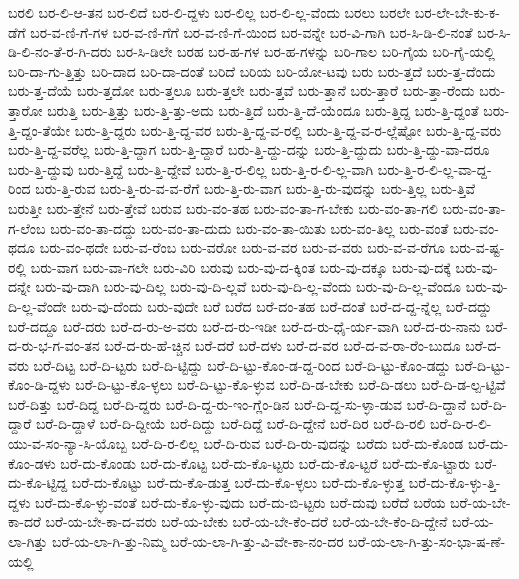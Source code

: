 {ಬರಲಿ
ಬರ-ಲಿ-ಆ-ತನ
ಬರ-ಲಿದೆ
ಬರ-ಲಿ-ದ್ದಳು
ಬರ-ಲಿಲ್ಲ
ಬರ-ಲಿ-ಲ್ಲ-ವೆಂದು
ಬರಲು
ಬರಲೇ
ಬರ-ಲೇ-ಬೇ-ಕು-ಕ-ಡೆಗೆ
ಬರ-ವ-ಣಿ-ಗೆ-ಗಳ
ಬರ-ವ-ಣಿ-ಗೆಗೆ
ಬರ-ವ-ಣಿ-ಗೆ-ಯಿಂದ
ಬರ-ವನ್ನೇ
ಬರ-ವಿ-ಗಾಗಿ
ಬರ-ಸಿ-ಡಿ-ಲಿ-ನಂತೆ
ಬರ-ಸಿ-ಡಿ-ಲಿ-ನಂ-ತೆ-ರ-ಗಿ-ದರು
ಬರ-ಸಿ-ಡಿಲೇ
ಬರಹ
ಬರ-ಹ-ಗಳ
ಬರ-ಹ-ಗಳನ್ನು
ಬರಿ-ಗಾಲ
ಬರಿ-ಗೈಯ
ಬರಿ-ಗೈ-ಯಲ್ಲಿ
ಬರಿ-ದಾ-ಗು-ತ್ತಿತ್ತು
ಬರಿ-ದಾದ
ಬರಿ-ದಾ-ದಂತೆ
ಬರಿದೆ
ಬರಿಯ
ಬರಿ-ಯೋ-ಟವು
ಬರು
ಬರು-ತ್ತದೆ
ಬರು-ತ್ತ-ದೆಂದು
ಬರು-ತ್ತ-ದೆಯೆ
ಬರು-ತ್ತದೋ
ಬರು-ತ್ತಲೂ
ಬರು-ತ್ತಲೇ
ಬರು-ತ್ತವೆ
ಬರು-ತ್ತಾನೆ
ಬರು-ತ್ತಾರೆ
ಬರು-ತ್ತಾ-ರೆಂದು
ಬರು-ತ್ತಾರೋ
ಬರುತ್ತಿ
ಬರು-ತ್ತಿತ್ತು
ಬರು-ತ್ತಿ-ತ್ತು-ಅದು
ಬರು-ತ್ತಿದೆ
ಬರು-ತ್ತಿ-ದೆ-ಯೆಂದೂ
ಬರು-ತ್ತಿದ್ದ
ಬರು-ತ್ತಿ-ದ್ದಂತೆ
ಬರು-ತ್ತಿ-ದ್ದಂ-ತೆಯೇ
ಬರು-ತ್ತಿ-ದ್ದರು
ಬರು-ತ್ತಿ-ದ್ದ-ವರ
ಬರು-ತ್ತಿ-ದ್ದ-ವ-ರಲ್ಲಿ
ಬರು-ತ್ತಿ-ದ್ದ-ವ-ರ-ಲ್ಲೆಷ್ಟೋ
ಬರು-ತ್ತಿ-ದ್ದ-ವರು
ಬರು-ತ್ತಿ-ದ್ದ-ವರೆಲ್ಲ
ಬರು-ತ್ತಿ-ದ್ದಾಗ
ಬರು-ತ್ತಿ-ದ್ದಾರೆ
ಬರು-ತ್ತಿ-ದ್ದು-ದನ್ನು
ಬರು-ತ್ತಿ-ದ್ದುದು
ಬರು-ತ್ತಿ-ದ್ದು-ವಾ-ದರೂ
ಬರು-ತ್ತಿ-ದ್ದುವು
ಬರು-ತ್ತಿದ್ದೆ
ಬರು-ತ್ತಿ-ದ್ದೇವೆ
ಬರು-ತ್ತಿ-ರ-ಲಿಲ್ಲ
ಬರು-ತ್ತಿ-ರ-ಲಿ-ಲ್ಲ-ವಾಗಿ
ಬರು-ತ್ತಿ-ರ-ಲಿ-ಲ್ಲ-ವಾ-ದ್ದ-ರಿಂದ
ಬರು-ತ್ತಿ-ರುವ
ಬರು-ತ್ತಿ-ರು-ವ-ವ-ರೆಗೆ
ಬರು-ತ್ತಿ-ರು-ವಾಗ
ಬರು-ತ್ತಿ-ರು-ವುದನ್ನು
ಬರು-ತ್ತಿಲ್ಲ
ಬರು-ತ್ತಿವೆ
ಬರುತ್ತೀ
ಬರು-ತ್ತೇನೆ
ಬರು-ತ್ತೇವೆ
ಬರುವ
ಬರು-ವಂ-ತಹ
ಬರು-ವಂ-ತಾ-ಗ-ಬೇಕು
ಬರು-ವಂ-ತಾ-ಗಲಿ
ಬರು-ವಂ-ತಾ-ಗ-ಲೆಂಬ
ಬರು-ವಂ-ತಾ-ದದ್ದು
ಬರು-ವಂ-ತಾ-ದುದು
ಬರು-ವಂ-ತಾ-ಯಿತು
ಬರು-ವಂ-ತಿಲ್ಲ
ಬರು-ವಂತೆ
ಬರು-ವಂ-ಥದೂ
ಬರು-ವಂ-ಥದೇ
ಬರು-ವ-ರೆಂಬ
ಬರು-ವರೋ
ಬರು-ವ-ವರ
ಬರು-ವ-ವರು
ಬರು-ವ-ವ-ರೆಗೂ
ಬರು-ವ-ಷ್ಟ-ರಲ್ಲಿ
ಬರು-ವಾಗ
ಬರು-ವಾ-ಗಲೇ
ಬರು-ವಿರಿ
ಬರುವು
ಬರು-ವು-ದ-ಕ್ಕಿಂತ
ಬರು-ವು-ದಕ್ಕೂ
ಬರು-ವು-ದಕ್ಕೆ
ಬರು-ವು-ದನ್ನೇ
ಬರು-ವು-ದಾಗಿ
ಬರು-ವು-ದಿಲ್ಲ
ಬರು-ವು-ದಿ-ಲ್ಲವೆ
ಬರು-ವು-ದಿ-ಲ್ಲ-ವೆಂದು
ಬರು-ವು-ದಿ-ಲ್ಲ-ವೆಂದೂ
ಬರು-ವು-ದಿ-ಲ್ಲ-ವೆಂದೇ
ಬರು-ವು-ದೆಂದು
ಬರು-ವುದೇ
ಬರೆ
ಬರೆದ
ಬರೆ-ದಂ-ತಹ
ಬರೆ-ದಂತೆ
ಬರೆ-ದ-ದ್ದ-ನ್ನೆಲ್ಲ
ಬರೆ-ದದ್ದು
ಬರೆ-ದದ್ದೂ
ಬರೆ-ದರು
ಬರೆ-ದ-ರು-ಅ-ವರು
ಬರೆ-ದ-ರು-ಇಡೀ
ಬರೆ-ದ-ರು-ಧೈ-ರ್ಯ-ವಾಗಿ
ಬರೆ-ದ-ರು-ನಾನು
ಬರೆ-ದ-ರು-ಭ-ಗ-ವಂ-ತನ
ಬರೆ-ದ-ರು-ಹೆ-ಚ್ಚಿನ
ಬರೆ-ದರೆ
ಬರೆ-ದಳು
ಬರೆ-ದ-ವರ
ಬರೆ-ದ-ವ-ರಾ-ರೆಂ-ಬುದೂ
ಬರೆ-ದ-ವರು
ಬರೆ-ದಿಟ್ಟ
ಬರೆ-ದಿ-ಟ್ಟರು
ಬರೆ-ದಿ-ಟ್ಟಿದ್ದು
ಬರೆ-ದಿ-ಟ್ಟು-ಕೊಂ-ಡ-ದ್ದ-ರಿಂದ
ಬರೆ-ದಿ-ಟ್ಟು-ಕೊಂ-ಡದ್ದು
ಬರೆ-ದಿ-ಟ್ಟು-ಕೊಂ-ಡಿ-ದ್ದಳು
ಬರೆ-ದಿ-ಟ್ಟು-ಕೊ-ಳ್ಳಲು
ಬರೆ-ದಿ-ಟ್ಟು-ಕೊ-ಳ್ಳುವ
ಬರೆ-ದಿ-ಡ-ಬೇಕು
ಬರೆ-ದಿ-ಡಲು
ಬರೆ-ದಿ-ಡ-ಲ್ಪ-ಟ್ಟಿವೆ
ಬರೆ-ದಿತ್ತು
ಬರೆ-ದಿದ್ದ
ಬರೆ-ದಿ-ದ್ದರು
ಬರೆ-ದಿ-ದ್ದ-ರು-ಇಂ-ಗ್ಲೆಂ-ಡಿನ
ಬರೆ-ದಿ-ದ್ದ-ಸು-ಳ್ಳಾ-ಡುವ
ಬರೆ-ದಿ-ದ್ದಾನೆ
ಬರೆ-ದಿ-ದ್ದಾರೆ
ಬರೆ-ದಿ-ದ್ದಾಳೆ
ಬರೆ-ದಿ-ದ್ದೀಯೆ
ಬರೆ-ದಿದ್ದು
ಬರೆ-ದಿದ್ದೆ
ಬರೆ-ದಿ-ದ್ದೇನೆ
ಬರೆ-ದಿರ
ಬರೆ-ದಿ-ರಲಿ
ಬರೆ-ದಿ-ರ-ಲಿ-ಯು-ವ-ಸಂ-ನ್ಯಾ-ಸಿ-ಯೊಬ್ಬ
ಬರೆ-ದಿ-ರ-ಲಿಲ್ಲ
ಬರೆ-ದಿ-ರುವ
ಬರೆ-ದಿ-ರು-ವುದನ್ನು
ಬರೆದು
ಬರೆ-ದು-ಕೊಂಡ
ಬರೆ-ದು-ಕೊಂ-ಡಳು
ಬರೆ-ದು-ಕೊಂಡು
ಬರೆ-ದು-ಕೊಟ್ಟ
ಬರೆ-ದು-ಕೊ-ಟ್ಟರು
ಬರೆ-ದು-ಕೊ-ಟ್ಟರೆ
ಬರೆ-ದು-ಕೊ-ಟ್ಟಾರು
ಬರೆ-ದು-ಕೊ-ಟ್ಟಿದ್ದ
ಬರೆ-ದು-ಕೊಟ್ಟು
ಬರೆ-ದು-ಕೊ-ಡುತ್ತ
ಬರೆ-ದು-ಕೊ-ಳ್ಳಲು
ಬರೆ-ದು-ಕೊ-ಳ್ಳುತ್ತ
ಬರೆ-ದು-ಕೊ-ಳ್ಳು-ತ್ತಿ-ದ್ದಳು
ಬರೆ-ದು-ಕೊ-ಳ್ಳು-ವಂತೆ
ಬರೆ-ದು-ಕೊ-ಳ್ಳು-ವುದು
ಬರೆ-ದು-ಬಿ-ಟ್ಟರು
ಬರೆ-ದುವು
ಬರೆದೆ
ಬರೆಯ
ಬರೆ-ಯ-ಬೇ-ಕಾ-ದರೆ
ಬರೆ-ಯ-ಬೇ-ಕಾ-ದ-ವರು
ಬರೆ-ಯ-ಬೇಕು
ಬರೆ-ಯ-ಬೇ-ಕೆಂ-ದರೆ
ಬರೆ-ಯ-ಬೇ-ಕೆಂ-ದಿ-ದ್ದೇನೆ
ಬರೆ-ಯ-ಲಾ-ಗಿತ್ತು
ಬರೆ-ಯ-ಲಾ-ಗಿ-ತ್ತು-ನಿಮ್ಮ
ಬರೆ-ಯ-ಲಾ-ಗಿ-ತ್ತು-ವಿ-ವೇ-ಕಾ-ನಂ-ದರ
ಬರೆ-ಯ-ಲಾ-ಗಿ-ತ್ತು-ಸಂ-ಭಾ-ಷ-ಣೆ-ಯಲ್ಲಿ
}
